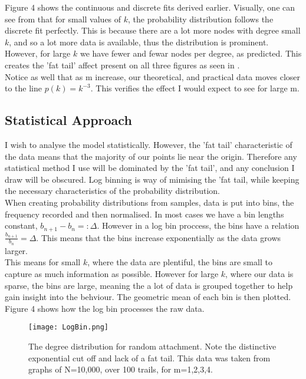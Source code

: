 \documentclass[]{article}
\begin{document}
 Figure 4 shows the continuous and discrete fits derived earlier. Visually, one can see from that for small values of $k$, the probability distribution follows the discrete fit perfectly. This is because there are a lot more nodes with degree small $k$, and so a lot more data is available, thus the distribution is prominent. However, for large $k$ we have fewer and fewar nodes per degree, as predicted. This creates the 'fat tail' affect present on all three figures as seen in . \\
Notice as well that as m increase, our theoretical, and practical data moves closer to the line $p(k)=k^{-3}$. This verifies the effect I would expect to see for large m.
\subsection{Statistical Approach}
I wish to analyse the model statistically. However, the 'fat tail' characteristic of the data means that the majority of our points lie near the origin. Therefore any statistical method I use will be dominated by the 'fat tail', and any conclusion I draw will be obscured. Log binning is way of mimising the 'fat tail, while keeping the necessary characteristics of the probability distribution.\\
When creating probability distributions from samples, data is put into bins, the frequency recorded and then normalised. In most cases we have a bin lengths constant, $b_{n+1}-b_{n}=:\Delta$. However in a log bin proccess, the bins have a relation $\frac{b_{n+1}}{b_n}=\Delta$. This means that the bins increase exponentially as the data grows larger. \\
This means for small $k$, where the data are plentiful, the bins are small to capture as much information as possible. However for large $k$,  where our data is sparse, the bins are large, meaning the a lot of data is grouped together to help gain insight into the behviour. The geometric mean of each bin is then plotted. Figure 4 shows how the log bin processes the raw data.

\begin{figure}[htbp]
	\centering
	
	\texttt{[image: LogBin.png]}
	\caption{The degree distribution for random attachment. Note the distinctive exponential cut off and lack of a fat tail. This data was taken from graphs of N=10,000, over 100 trails, for m=1,2,3,4.}
\end{figure}	 	
 
\end{document}
